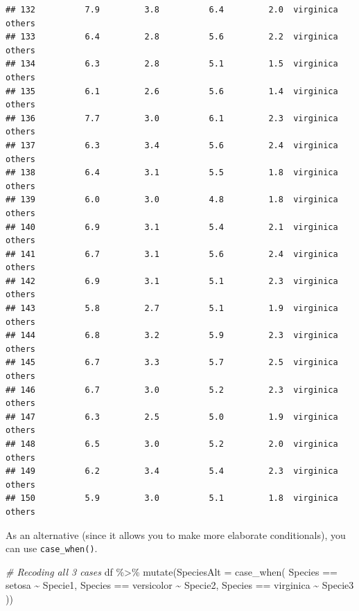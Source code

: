 \documentclass[
]{book}
\newenvironment{Shaded}{\begin{snugshade}}{\end{snugshade}}
\newcommand{\AttributeTok}[1]{\textcolor[rgb]{0.77,0.63,0.00}{#1}}
\newcommand{\CommentTok}[1]{\textcolor[rgb]{0.56,0.35,0.01}{\textit{#1}}}
\newcommand{\FunctionTok}[1]{\textcolor[rgb]{0.00,0.00,0.00}{#1}}
\newcommand{\NormalTok}[1]{#1}
\newcommand{\SpecialCharTok}[1]{\textcolor[rgb]{0.00,0.00,0.00}{#1}}
\newcommand{\StringTok}[1]{\textcolor[rgb]{0.31,0.60,0.02}{#1}}
\begin{document}
\begin{verbatim}
## 132          7.9         3.8          6.4         2.0  virginica     others
## 133          6.4         2.8          5.6         2.2  virginica     others
## 134          6.3         2.8          5.1         1.5  virginica     others
## 135          6.1         2.6          5.6         1.4  virginica     others
## 136          7.7         3.0          6.1         2.3  virginica     others
## 137          6.3         3.4          5.6         2.4  virginica     others
## 138          6.4         3.1          5.5         1.8  virginica     others
## 139          6.0         3.0          4.8         1.8  virginica     others
## 140          6.9         3.1          5.4         2.1  virginica     others
## 141          6.7         3.1          5.6         2.4  virginica     others
## 142          6.9         3.1          5.1         2.3  virginica     others
## 143          5.8         2.7          5.1         1.9  virginica     others
## 144          6.8         3.2          5.9         2.3  virginica     others
## 145          6.7         3.3          5.7         2.5  virginica     others
## 146          6.7         3.0          5.2         2.3  virginica     others
## 147          6.3         2.5          5.0         1.9  virginica     others
## 148          6.5         3.0          5.2         2.0  virginica     others
## 149          6.2         3.4          5.4         2.3  virginica     others
## 150          5.9         3.0          5.1         1.8  virginica     others
\end{verbatim}

As an alternative (since it allows you to make more elaborate conditionals), you can use \texttt{case\_when()}.

\begin{Shaded}
\begin{Highlighting}[]
\CommentTok{\# Recoding all 3 cases}
\NormalTok{df }\SpecialCharTok{\%\textgreater{}\%} 
  \FunctionTok{mutate}\NormalTok{(}\AttributeTok{SpeciesAlt =} \FunctionTok{case\_when}\NormalTok{(}
\NormalTok{    Species }\SpecialCharTok{==} \StringTok{\textquotesingle{}setosa\textquotesingle{}} \SpecialCharTok{\textasciitilde{}} \StringTok{\textquotesingle{}Specie1\textquotesingle{}}\NormalTok{,}
\NormalTok{    Species }\SpecialCharTok{==} \StringTok{\textquotesingle{}versicolor\textquotesingle{}} \SpecialCharTok{\textasciitilde{}} \StringTok{\textquotesingle{}Specie2\textquotesingle{}}\NormalTok{,}
\NormalTok{    Species }\SpecialCharTok{==} \StringTok{\textquotesingle{}virginica\textquotesingle{}} \SpecialCharTok{\textasciitilde{}} \StringTok{\textquotesingle{}Specie3\textquotesingle{}}
\NormalTok{  ))}
\end{Highlighting}
\end{Shaded}
\end{document}
